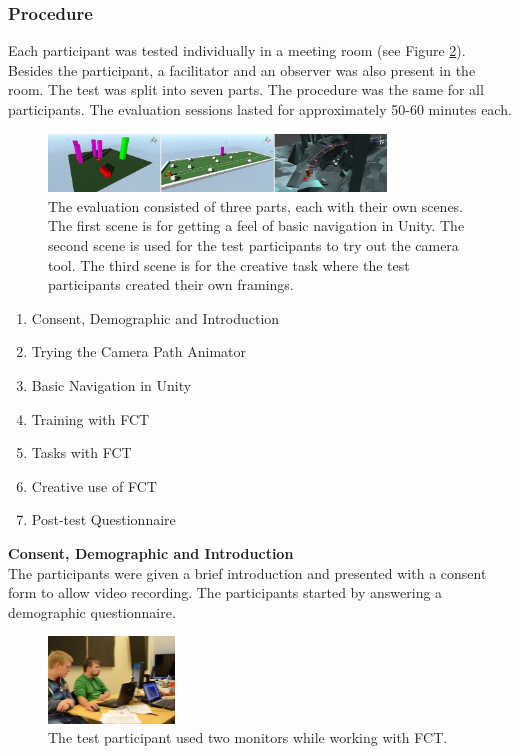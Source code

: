 \subsubsection{Procedure}
Each participant was tested individually in a meeting room (see Figure \ref{fig:tt}). Besides the participant, a facilitator and an observer was also present in the room. The test was split into seven parts. The procedure was the same for all participants. The evaluation sessions lasted for approximately 50-60 minutes each.

\begin{figure}[hbtp]
\centering
\includegraphics[width=0.8\textwidth]{Pics/sceneAll_horizontal}
\caption{The evaluation consisted of three parts, each with their own scenes. The first scene is for getting a feel of basic navigation in Unity. The second scene is used for the test participants to try out the camera tool. The third scene is for the creative task where the test participants created their own framings.}
\label{fig:sceneAll}
\end{figure}

\begin{enumerate}
\item Consent, Demographic and Introduction
\item Trying the Camera Path Animator
\item Basic Navigation in Unity
\item Training with FCT
\item Tasks with FCT
\item Creative use of FCT
\item Post-test Questionnaire
\end{enumerate}

\textbf{Consent, Demographic and Introduction}\\
The participants were given a brief introduction and presented with a consent form to allow video recording. The participants started by answering a demographic questionnaire. 

\begin{figure}[htbp]
\centering
\includegraphics[width=0.3\textwidth]{Pics/test_setup}
\caption{The test participant used two monitors while working with FCT.}
\label{fig:tt}
\end{figure}

